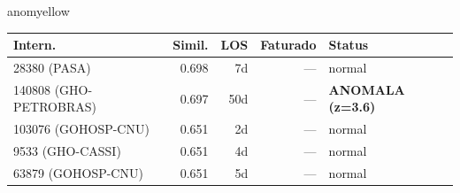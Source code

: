 \documentclass[a4paper,10pt]{article}
\begin{document}
\begin{anomalycard}[Internacao 80516 | GHO-PETROBRAS | MODERADO (z=2.27)]{anomyellow}
\begin{tabular}{l r r r l}\toprule\textbf{Intern.} & \textbf{Simil.} & \textbf{LOS} & \textbf{Faturado} & \textbf{Status} \\\midrule
28380 (PASA) & 0.698 & 7d & --- & \textcolor{jcubeblue}{normal} \\
140808 (GHO-PETROBRAS) & 0.697 & 50d & --- & \textcolor{anomred}{\textbf{ANOMALA (z=3.6)}} \\
103076 (GOHOSP-CNU) & 0.651 & 2d & --- & \textcolor{jcubeblue}{normal} \\
9533 (GHO-CASSI) & 0.651 & 4d & --- & \textcolor{jcubeblue}{normal} \\
63879 (GOHOSP-CNU) & 0.651 & 5d & --- & \textcolor{jcubeblue}{normal} \\
\bottomrule\end{tabular}


\end{anomalycard}

\newpage
\end{document}
